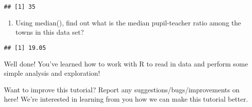 \documentclass[
]{article}
\newenvironment{Shaded}{\begin{snugshade}}{\end{snugshade}}
\newcommand{\FunctionTok}[1]{\textcolor[rgb]{0.00,0.00,0.00}{#1}}
\newcommand{\NormalTok}[1]{#1}
\newcommand{\SpecialCharTok}[1]{\textcolor[rgb]{0.00,0.00,0.00}{#1}}
\providecommand{\tightlist}{%
  \setlength{\itemsep}{0pt}\setlength{\parskip}{0pt}}
\begin{document}
\begin{verbatim}
## [1] 35
\end{verbatim}

\begin{enumerate}
\def\labelenumi{\alph{enumi}.}
\setcounter{enumi}{3}
\tightlist
\item
  Using median(), find out what is the median pupil-teacher ratio among
  the towns in this data set?
\end{enumerate}

\begin{Shaded}
\end{Shaded}

\begin{verbatim}
## [1] 19.05
\end{verbatim}

Well done! You've learned how to work with R to read in data and perform
some simple analysis and exploration!

Want to improve this tutorial? Report any suggestions/bugs/improvements
on here! We're interested in learning from you how we can make this
tutorial better.
\end{document}
